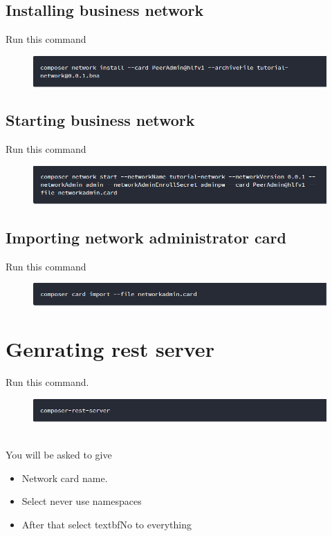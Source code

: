 \subsection{Installing business network}
Run this command 
\begin{figure}[h]
	\centering
	\includegraphics[width=450px]{figures/installation/14.png}
\end{figure}

\subsection{Starting business network}
Run this command 
\begin{figure}[h]
	\centering
	\includegraphics[width=450px]{figures/installation/15.png}
\end{figure}
\subsection{Importing network administrator card}
Run this command 
\begin{figure}[h]
	\centering
	\includegraphics[width=450px]{figures/installation/16.png}
\end{figure}
\newpage
\section{Genrating rest server}

Run this command. 
\begin{figure}[h]
	\centering
	\includegraphics[width=450px]{figures/installation/18.png}
\end{figure}\\
You will be asked to give 
\begin{itemize}
	\item Network card name. 
	\item Select never use namespaces
	\item After that select textbf{No} to everything
\end{itemize}



